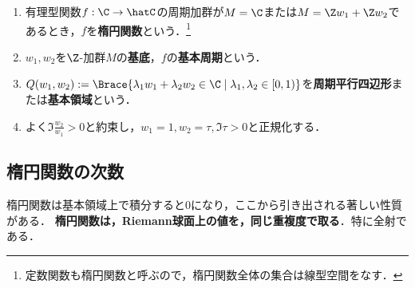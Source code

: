 \documentclass[uplatex, dvipdfmx]{jsreport}
\begin{document}
\begin{definition}\mbox{}
    \begin{enumerate}
        \item 有理型関数$f:\C\to\hatC$の周期加群が$M=\C$または$M=\Z w_1+\Z w_2$であるとき，$f$を\textbf{楕円関数}という．\footnote{定数関数も楕円関数と呼ぶので，楕円関数全体の集合は線型空間をなす．}
        \item $w_1,w_2$を$\Z$-加群$M$の\textbf{基底}，$f$の\textbf{基本周期}という．
        \item $Q(w_1,w_2):=\Brace{\lambda_1w_1+\lambda_2w_2\in\C\mid\lambda_1,\lambda_2\in[0,1)}$を\textbf{周期平行四辺形}または\textbf{基本領域}という．
        \item よく$\Im\frac{w_2}{w_1}>0$と約束し，$w_1=1,w_2=\tau,\Im\tau>0$と正規化する．
    \end{enumerate}
\end{definition}

\subsection{楕円関数の次数}

\begin{tcolorbox}[colframe=ForestGreen, colback=ForestGreen!10!white,breakable,colbacktitle=ForestGreen!40!white,coltitle=black,fonttitle=\bfseries\sffamily,
title=楕円関数は，Riemann球面上の値を，同じ重複度で取る]
    楕円関数は基本領域上で積分すると$0$になり，ここから引き出される著しい性質がある．
    \textbf{楕円関数は，Riemann球面上の値を，同じ重複度で取る}．特に全射である．
\end{tcolorbox}
\end{document}
